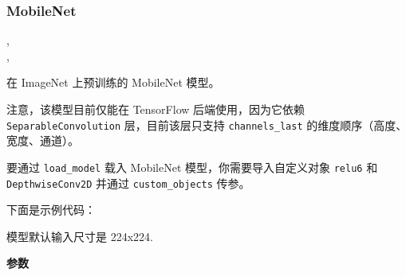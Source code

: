 \subsubsection{MobileNet}\label{mobilenet}

\begin{Shaded}
\begin{Highlighting}[]
\OperatorTok{=}\OperatorTok{=}, \\
\hspace{3cm}\OperatorTok{=}\OperatorTok{=}\OperatorTok{=}, \\
\hspace{3cm}\OperatorTok{=}\OperatorTok{=}\OperatorTok{=}\OperatorTok{=}\NormalTok{)}
\end{Highlighting}
\end{Shaded}

在 ImageNet 上预训练的 MobileNet 模型。

注意，该模型目前仅能在 TensorFlow 后端使用，因为它依赖
\texttt{SeparableConvolution} 层，目前该层只支持 \texttt{channels\_last}
的维度顺序（高度、宽度、通道）。

要通过 \texttt{load\_model} 载入 MobileNet 模型，你需要导入自定义对象
\texttt{relu6} 和 \texttt{DepthwiseConv2D} 并通过
\texttt{custom\_objects} 传参。

下面是示例代码：

\begin{Shaded}
\begin{Highlighting}[]
\OperatorTok{=} \OperatorTok{=}\NormalTok{\{}
\end{Highlighting}
\end{Shaded}

模型默认输入尺寸是 224x224.

\textbf{参数}\label{ux53c2ux6570-6}

